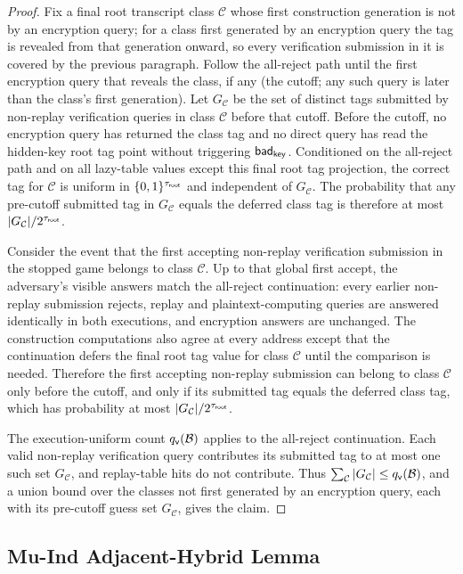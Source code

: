 \begin{proof}
Fix a final root transcript class $\mathcal{C}$ whose first
construction generation is not by an encryption query; for a class
first generated by an encryption query the tag is revealed from that
generation onward, so every verification submission in it is covered by
the previous paragraph. Follow the all-reject path until the first
encryption query that reveals the class, if any (the cutoff; any such
query is later than the class's first generation). Let
$G_{\mathcal{C}}$ be the set of distinct
tags submitted by non-replay verification queries in class
$\mathcal{C}$ before that cutoff. Before the cutoff, no encryption query
has returned the class tag and no direct query has read the hidden-key
root tag point without triggering $\mathsf{bad}_{\mathsf{key}}$. Conditioned on the
all-reject path and on all lazy-table values except this final root tag
projection, the correct tag for $\mathcal{C}$ is uniform in
$\{0,1\}^{\tau_{\mathsf{root}}}$ and independent of $G_{\mathcal{C}}$. The
probability that any pre-cutoff submitted tag in $G_{\mathcal{C}}$
equals the deferred class tag is therefore at most
$|G_{\mathcal{C}}|/2^{\tau_{\mathsf{root}}}$.

Consider the event that the first accepting non-replay verification
submission in the stopped game belongs to class $\mathcal{C}$. Up to
that global first accept, the adversary's visible answers match the
all-reject continuation: every earlier non-replay submission rejects,
replay and plaintext-computing queries are answered identically in both
executions, and encryption answers are unchanged. The construction
computations also agree at every address except that the continuation
defers the final root tag value for class $\mathcal{C}$ until the
comparison is needed. Therefore the first accepting non-replay
submission can belong to class $\mathcal{C}$ only before the cutoff,
and only if its submitted tag equals the deferred class tag, which has
probability at most $|G_{\mathcal{C}}|/2^{\tau_{\mathsf{root}}}$.

The execution-uniform count $q_{\mathsf{v}}(\mathcal{B})$ applies to the
all-reject continuation. Each valid non-replay verification query
contributes its submitted tag
to at most one such set $G_{\mathcal{C}}$, and replay-table hits do not
contribute. Thus
$\sum_{\mathcal{C}} |G_{\mathcal{C}}| \leq q_{\mathsf{v}}(\mathcal{B})$, and a
union bound over the classes not first generated by an encryption
query, each with its pre-cutoff guess set $G_{\mathcal{C}}$, gives the
claim.
\end{proof}

\subsection{Mu-Ind Adjacent-Hybrid Lemma}


